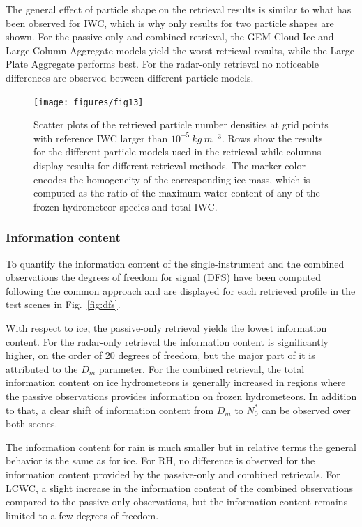 \documentclass[journal abbreviation, manuscript]{copernicus}
\begin{document}
The general effect of particle shape on the retrieval results is similar to what
has been observed for IWC, which is why only results for two particle shapes are
shown. For the passive-only and combined retrieval, the GEM Cloud Ice and Large
Column Aggregate models yield the worst retrieval results, while the Large Plate
Aggregate performs best. For the radar-only retrieval no noticeable differences
are observed between different particle models.

\begin{figure}
\centering
\texttt{[image: figures/fig13]}
\caption{Scatter plots of the retrieved particle number densities at grid points
  with reference IWC larger than $10^{-5}\ \unit{kg\ m^{-3}}$. Rows show
  the results for the different particle models used in the retrieval while
  columns display  results for  different retrieval methods. The marker
  color encodes the homogeneity of the corresponding ice mass, which is computed
  as the ratio of the maximum water content of any of the frozen hydrometeor
  species and total IWC.}
\label{fig:results_nd_scatter_a}
\end{figure}

\subsubsection{Information content}

To quantify the information content of the single-instrument and the combined
observations the degrees of freedom for signal (DFS) have been computed
following the common approach \citep{rodgers00, mahfouf15, grutzun18} and are
displayed for each retrieved profile in the test scenes in Fig.~\ref{fig:dfs}.

With respect to ice, the passive-only retrieval yields the lowest information
content. For the radar-only retrieval the information content is significantly
higher, on the order of 20 degrees of freedom, but the major part of it is
attributed to the $D_m$ parameter. For the combined retrieval, the total
information content on ice hydrometeors is generally increased in regions where
the passive observations provides information on frozen hydrometeors. In
addition to that, a clear shift of information content from $D_m$ to $N_0^*$ can
be observed over both scenes.

The information content for rain is much smaller but in relative terms the
general behavior is the same as for ice. For RH, no difference is observed for
the information content provided by the passive-only and combined retrievals.
For LCWC, a slight increase in the information content of the combined
observations compared to the passive-only observations, but the information
content remains limited to a few degrees of freedom.
\end{document}
